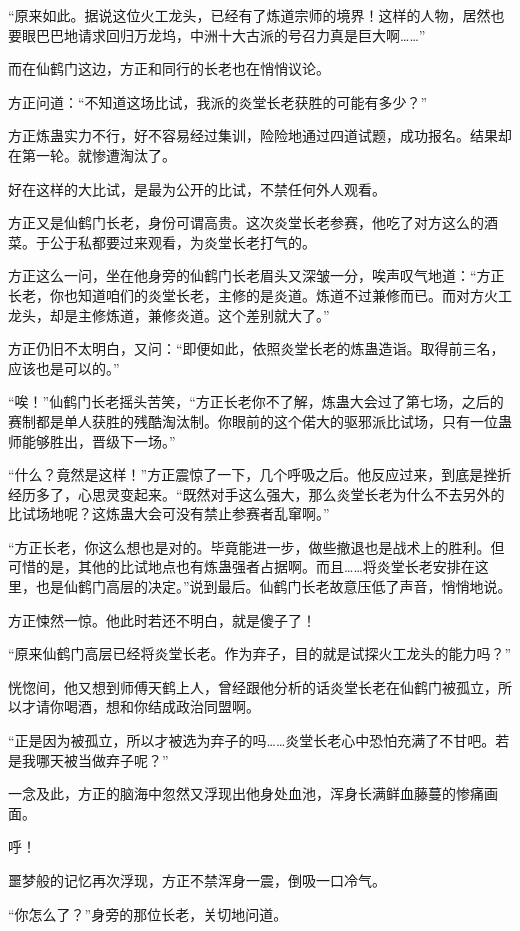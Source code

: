 \begin{this_body}
“原来如此。据说这位火工龙头，已经有了炼道宗师的境界！这样的人物，居然也要眼巴巴地请求回归万龙坞，中洲十大古派的号召力真是巨大啊……”

而在仙鹤门这边，方正和同行的长老也在悄悄议论。

方正问道：“不知道这场比试，我派的炎堂长老获胜的可能有多少？”

方正炼蛊实力不行，好不容易经过集训，险险地通过四道试题，成功报名。结果却在第一轮。就惨遭淘汰了。

好在这样的大比试，是最为公开的比试，不禁任何外人观看。

方正又是仙鹤门长老，身份可谓高贵。这次炎堂长老参赛，他吃了对方这么的酒菜。于公于私都要过来观看，为炎堂长老打气的。

方正这么一问，坐在他身旁的仙鹤门长老眉头又深皱一分，唉声叹气地道：“方正长老，你也知道咱们的炎堂长老，主修的是炎道。炼道不过兼修而已。而对方火工龙头，却是主修炼道，兼修炎道。这个差别就大了。”

方正仍旧不太明白，又问：“即便如此，依照炎堂长老的炼蛊造诣。取得前三名，应该也是可以的。”

“唉！”仙鹤门长老摇头苦笑，“方正长老你不了解，炼蛊大会过了第七场，之后的赛制都是单人获胜的残酷淘汰制。你眼前的这个偌大的驱邪派比试场，只有一位蛊师能够胜出，晋级下一场。”

“什么？竟然是这样！”方正震惊了一下，几个呼吸之后。他反应过来，到底是挫折经历多了，心思灵变起来。“既然对手这么强大，那么炎堂长老为什么不去另外的比试场地呢？这炼蛊大会可没有禁止参赛者乱窜啊。”

“方正长老，你这么想也是对的。毕竟能进一步，做些撤退也是战术上的胜利。但可惜的是，其他的比试地点也有炼蛊强者占据啊。而且……将炎堂长老安排在这里，也是仙鹤门高层的决定。”说到最后。仙鹤门长老故意压低了声音，悄悄地说。

方正悚然一惊。他此时若还不明白，就是傻子了！

“原来仙鹤门高层已经将炎堂长老。作为弃子，目的就是试探火工龙头的能力吗？”

恍惚间，他又想到师傅天鹤上人，曾经跟他分析的话炎堂长老在仙鹤门被孤立，所以才请你喝酒，想和你结成政治同盟啊。

“正是因为被孤立，所以才被选为弃子的吗……炎堂长老心中恐怕充满了不甘吧。若是我哪天被当做弃子呢？”

一念及此，方正的脑海中忽然又浮现出他身处血池，浑身长满鲜血藤蔓的惨痛画面。

呼！

噩梦般的记忆再次浮现，方正不禁浑身一震，倒吸一口冷气。

“你怎么了？”身旁的那位长老，关切地问道。


\end{this_body}
